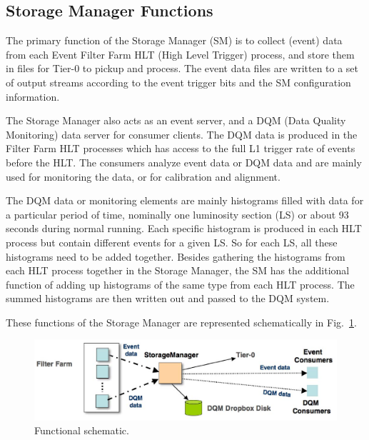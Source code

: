 \subsection{Storage Manager Functions}

The primary function of the Storage Manager (SM) is to collect (event) data from
each Event Filter Farm HLT (High Level Trigger) process, and store them in files
for Tier-0 to pickup and process.
The event data files are written to a set of output streams according to
the event trigger bits and the SM configuration information.

The Storage Manager also acts as an event server, and a DQM (Data Quality
Monitoring)  data server for consumer clients. The DQM data is produced in the
Filter Farm HLT processes which has access to the full L1
trigger rate of events before the HLT. The consumers analyze event data
or DQM data and are mainly used for monitoring the data, or for calibration
and alignment.

The DQM data or monitoring elements are mainly histograms filled with data for a particular
period of time, nominally one luminosity section (LS) or about 93 seconds
during normal running. Each specific histogram is produced in each HLT process
but contain different events for a given LS. So for each LS, all these
histograms need to be added together. Besides gathering the histograms
from each HLT process together in the Storage Manager, the SM has the additional 
function of adding up histograms of the same type from each HLT process.
The summed histograms are then written out and passed to the DQM system.

These functions of the Storage Manager are represented schematically
in Fig.~\ref{fig:schematic_simple}.

\begin{figure}[hbtp]
  \begin{center}
    \includegraphics[width=5.5in]{Software/schematic_simple.eps}
    \caption{Functional schematic.}
    \label{fig:schematic_simple}
  \end{center}
\end{figure}

